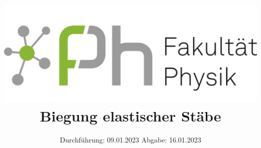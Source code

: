 

\subject{V103}
\title{\includegraphics[scale=0.2]{Logo.png}\\
Biegung elastischer Stäbe}
\date{%
  Durchführung: 09.01.2023
  \hspace{3em}
  Abgabe: 16.01.2023
}



\maketitle
\thispagestyle{empty}
\tableofcontents
\newpage







\printbibliography{}


